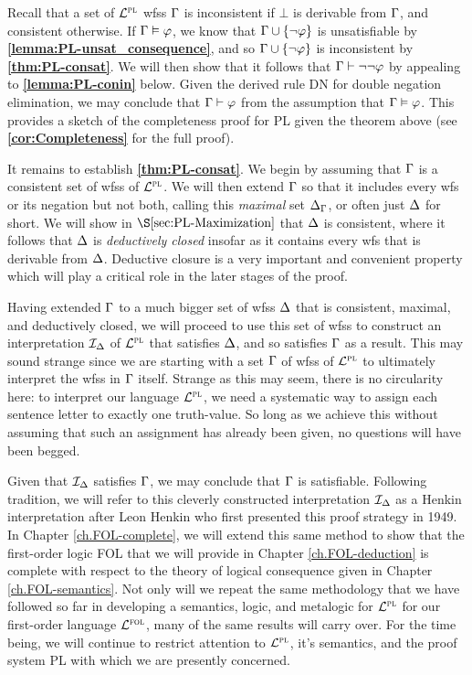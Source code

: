 Recall that a set of $\mathcal{L}^{\textsc{pl}}$ wfss $\Gamma$ is inconsistent if $\bot$ is derivable from $\Gamma$, and consistent otherwise.
If $\Gamma\vDash\varphi$, we know that $\Gamma\cup\lbrace\neg\varphi\rbrace$ is unsatisfiable by \textbf{\ref{lemma:PL-unsat_consequence}}, and so $\Gamma\cup\lbrace\neg\varphi\rbrace$ is inconsistent by \textbf{\ref{thm:PL-consat}}.
We will then show that it follows that $\Gamma \vdash \neg \neg \varphi$ by appealing to \textbf{\ref{lemma:PL-conin}} below. 
Given the derived rule DN for double negation elimination, we may conclude that $\Gamma\vdash\varphi$ from the assumption that $\Gamma\vDash\varphi$. 
This provides a sketch of the completeness proof for PL given the theorem above (see \textbf{\ref{cor:Completeness}} for the full proof).

It remains to establish \textbf{\ref{thm:PL-consat}}.
We begin by assuming that $\Gamma$ is a consistent set of wfss of $\mathcal{L}^{\textsc{pl}}$. 
We will then extend $\Gamma$ so that it includes every wfs or its negation but not both, calling this \textit{maximal} set $\Delta_{\Gamma}$, or often just $\Delta$ for short. 
We will show in $\S\ref{sec:PL-Maximization}$ that $\Delta$ is consistent, where it follows that $\Delta$ is \textit{deductively closed} insofar as it contains every wfs that is derivable from $\Delta$.
Deductive closure is a very important and convenient property which will play a critical role in the later stages of the proof.

Having extended $\Gamma$ to a much bigger set of wfss $\Delta$ that is consistent, maximal, and deductively closed, we will proceed to use this set of wfss to construct an interpretation $\mathcal{I}_{\Delta}$ of $\mathcal{L}^{\textsc{pl}}$ that satisfies $\Delta$, and so satisfies $\Gamma$ as a result. 
This may sound strange since we are starting with a set $\Gamma$ of wfss of $\mathcal{L}^{\textsc{pl}}$ to ultimately interpret the wfss in $\Gamma$ itself.
Strange as this may seem, there is no circularity here: to interpret our language $\mathcal{L}^{\textsc{pl}}$, we need a systematic way to assign each sentence letter to exactly one truth-value.
So long as we achieve this without assuming that such an assignment has already been given, no questions will have been begged.

Given that $\mathcal{I}_{\Delta}$ satisfies $\Gamma$, we may conclude that $\Gamma$ is satisfiable. 
Following tradition, we will refer to this cleverly constructed interpretation $\mathcal{I}_{\Delta}$ as a Henkin interpretation after Leon Henkin who first presented this proof strategy in 1949.
In Chapter \ref{ch.FOL-complete}, we will extend this same method to show that the first-order logic FOL that we will provide in Chapter \ref{ch.FOL-deduction} is complete with respect to the theory of logical consequence given in Chapter \ref{ch.FOL-semantics}.
Not only will we repeat the same methodology that we have followed so far in developing a semantics, logic, and metalogic for $\mathcal{L}^{\textsc{pl}}$ for our first-order language $\mathcal{L}^{\textsc{fol}}$, many of the same results will carry over.
For the time being, we will continue to restrict attention to $\mathcal{L}^{\textsc{pl}}$, it's semantics, and the proof system PL with which we are presently concerned.

